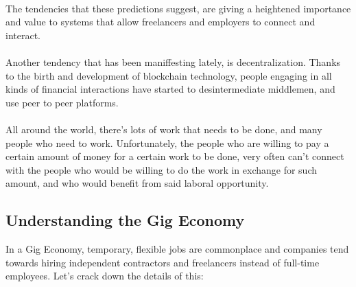 \documentclass{article}
\begin{document}
\paragraph{}The tendencies that these predictions suggest, are giving a heightened importance and value to systems that allow freelancers and employers to connect and interact.

\paragraph{}Another tendency that has been maniffesting lately, is decentralization. Thanks to the birth and development of blockchain technology, people engaging in all kinds of financial interactions have started to desintermediate middlemen, and use peer to peer platforms. 

\paragraph{} All around the world, there's lots of work that needs to be done, and many people who need to work. Unfortunately, the people who are willing to pay a certain amount of money for a certain work to be done, very often can't connect with the people who would be willing to do the work in exchange for such amount, and who would benefit from said laboral opportunity.

\subsection{Understanding the Gig Economy}
In a Gig Economy, temporary, flexible jobs are commonplace and companies tend towards hiring independent contractors and freelancers instead of full-time employees\cite{gig-economy-investopedia}. Let's crack down the details of this:
\end{document}
